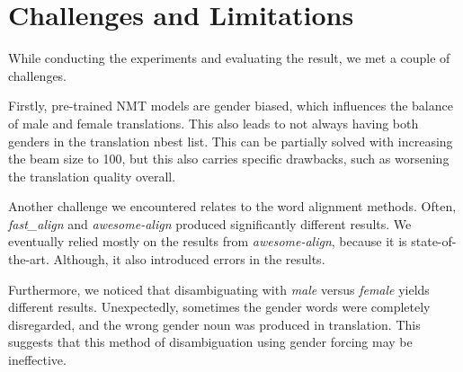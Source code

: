 \section{Challenges and Limitations}
\label{sec:Discussion:Challenges}

While conducting the experiments and evaluating the result, we met a couple of challenges.

Firstly, pre-trained NMT models are gender biased, which influences the balance of male and female translations. This also leads to not always having both genders in the translation nbest list. This can be partially solved with increasing the beam size to 100, but this also carries specific drawbacks, such as worsening the translation quality overall.

Another challenge we encountered relates to the word alignment methods. Often, \textit{fast\_align} and \textit{awesome-align} produced significantly different results. We eventually relied mostly on the results from \textit{awesome-align}, because it is state-of-the-art. Although, it also introduced errors in the results.

Furthermore, we noticed that disambiguating with \textit{male} versus \textit{female} yields different results. Unexpectedly, sometimes the gender words were completely disregarded, and the wrong gender noun was produced in translation. This suggests that this method of disambiguation using gender forcing may be ineffective.


